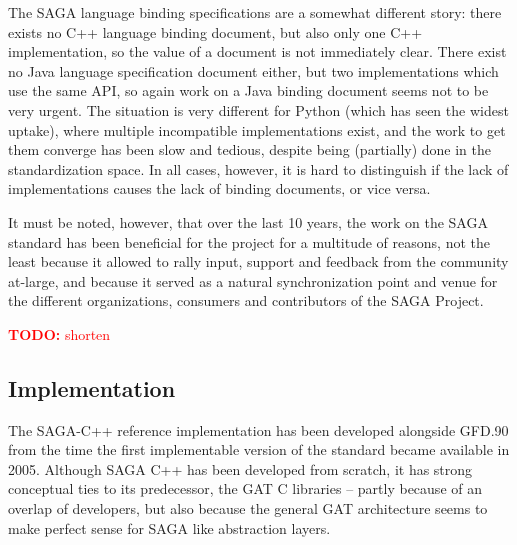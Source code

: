 \documentclass[]{article}
\newcommand{\B}[1]{\textbf{#1}}
\newcommand{\todo}[1]{{\textcolor{red}{\B{TODO:} #1 }}}
\newcommand{\alnote}[1]{{\textcolor{blue}{    \B{AndreL:  } #1 }}}
\newcommand{\alnote}[1]{}
\begin{document}
  The SAGA language binding specifications are a somewhat different
  story: there exists no C++ language binding document, but also only
  one C++ implementation, so the value of a document is not
  immediately clear.  There exist no Java language specification
  document either, but two implementations which use the same API, so 
  again work on a Java binding document seems not to be very urgent.  
  The situation is very different for Python (which has seen the widest 
  uptake), where multiple incompatible implementations exist, and the 
  work to get them converge has been slow and tedious, despite being 
  (partially) done in the standardization space.  In all cases, however, 
  it is hard to distinguish if the lack of implementations causes the 
  lack of binding documents, or vice versa.
  
  It must be noted, however, that over the last 10 years, the work on
  the SAGA standard has been beneficial for the project for a
  multitude of reasons, not the least because it allowed to rally
  input, support and feedback from the community at-large, and because
  it served as a natural synchronization point and venue for the
  different organizations, consumers and contributors of the SAGA
  Project.

  \todo{shorten}



\subsection{Implementation}

  The SAGA-C++ reference implementation has been developed alongside
  GFD.90 from the time the first implementable version of the standard
  became available in 2005. Although SAGA C++ has been developed from
  scratch, it has strong conceptual ties to its predecessor, the GAT
  C libraries -- partly because of an overlap of developers, but also
  because the general GAT architecture seems to make perfect sense for
  SAGA like abstraction layers.
\end{document}
